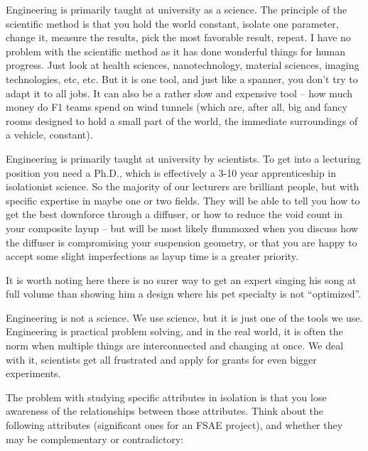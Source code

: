 \documentclass[10pt, a4paper, article, oneside, twocolumn, final]{memoir}
\begin{document}
Engineering is primarily taught at university as a science. The principle of the scientific method is that you hold the world constant, isolate one parameter, change it, measure the results, pick the most favorable result, repeat. I have no problem with the scientific method as it has done wonderful things for human progress. Just look at health sciences, nanotechnology, material sciences, imaging technologies, etc, etc. But it is one tool, and just like a spanner, you don’t try to adapt it to all jobs. It can also be a rather slow and expensive tool -- how much money do F1 teams spend on wind tunnels (which are, after all, big and fancy rooms designed to hold a small part of the world, the immediate surroundings of a vehicle, constant). 

Engineering is primarily taught at university by scientists. To get into a lecturing position you need a Ph.D., which is effectively a 3-10 year apprenticeship in isolationist science. So the majority of our lecturers are brilliant people, but with specific expertise in maybe one or two fields. They will be able to tell you how to get the best downforce through a diffuser, or how to reduce the void count in your composite layup -- but will be most likely flummoxed when you discuss how the diffuser is compromising your suspension geometry, or that you are happy to accept some slight imperfections as layup time is a greater priority. 

It is worth noting here there is no surer way to get an expert singing his song at full volume than showing him a design where his pet specialty is not “optimized”. 

Engineering is not a science. We use science, but it is just one of the tools we use. Engineering is practical problem solving, and in the real world, it is often the norm when multiple things are interconnected and changing at once. We deal with it, scientists get all frustrated and apply for grants for even bigger experiments.

The problem with studying specific attributes in isolation is that you lose awareness of the relationships between those attributes. Think about the following attributes (significant ones for an FSAE project), and whether they may be complementary or contradictory: 
\end{document}
